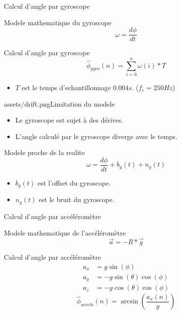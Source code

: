 \documentclass{beamer}
\begin{document}
\begin{frame}[fragile]{Calcul d'angle par gyroscope}
	\begin{block}{Modele mathematique du gyroscope}
		\begin{equation*}
			\omega = \frac{d\phi}{dt}
		\end{equation*}
	\end{block}
	\begin{block}{Calcul d'angle par gyroscope}
		\begin{equation*}
			\hat{\phi}_{gyro}(n) =  \sum_{i=0}^{n} \omega(i) * T
		\end{equation*}
	\end{block}
	\begin{itemize}
		\item $T$ est le temps d'echantillonnage $0.004s$.  ($f_e = 250Hz$)
	\end{itemize}
\end{frame}

\begin{sidepic}{assets/drift.png}{Limitation du modele}
	\begin{itemize}
		\item Le gyroscope est sujet à des dérives.
		\item L'angle calculé par le gyroscope diverge avec le temps.
	\end{itemize}
	\begin{block}{Modele proche de la realite}
		\begin{equation*}
			\omega = \frac{d\phi}{dt} + b_g(t) + n_g(t)
		\end{equation*}
	\end{block}
	\begin{itemize}
		\item $b_g(t)$ est l'offset du gyroscope.
		\item $n_g(t)$ est le bruit du gyroscope.
	\end{itemize}
\end{sidepic}



\begin{frame}[fragile]{Calcul d'angle par accéléromètre}
	\begin{block}{Modele mathematique de l'accéléromètre}
		\begin{equation*}
			\vec{a} = -R * \vec{g}
		\end{equation*}
	\end{block}
	\begin{block}{Calcul d'angle par accéléromètre}
		\begin{align*}
			a_x &= g \sin(\phi) \\
			a_y &= -g \sin(\theta) \cos(\phi)\\
			a_z &= -g \cos(\theta) \cos(\phi)
		\end{align*}
		\begin{equation*}
			\hat{\phi}_{accelo}(n) = \arcsin\left(\frac{a_x(n)}{g}\right)
		\end{equation*}
	\end{block}
\end{frame}
\end{document}
